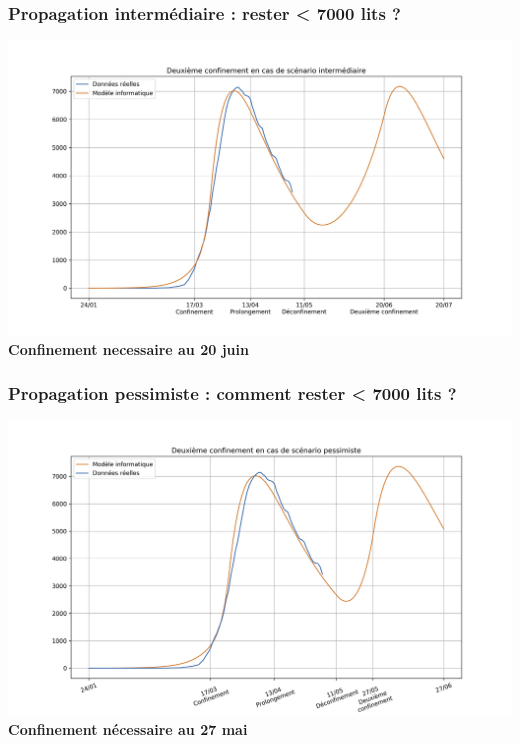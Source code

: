 \documentclass[a4paper]{cours-bdd}
\begin{document}

\begin{frame}[fragile]
\frametitle{Propagation intermédiaire : rester < 7000 lits ?}

  \begin{center}
    \includegraphics[width=1.0\linewidth]{figure5.jpg} \\

        \textbf{Confinement necessaire au 20 juin}
  \end{center}
  
\end{frame}


\begin{frame}[fragile]
\frametitle{Propagation pessimiste : comment rester < 7000 lits ?}
\begin{center}
\includegraphics[width=1.0\linewidth]{figure6.jpg} \\

\textbf{Confinement nécessaire au 27 mai}

  \end{center}
  
\end{frame}
\end{document}
